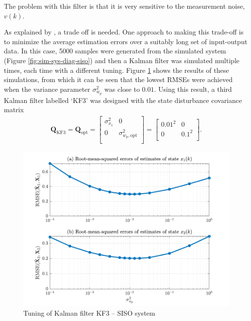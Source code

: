 The problem with this filter is that it is very sensitive to the measurement noise, $v(k)$. 

As explained by \cite{robertson_detection_1995}, a trade off is needed. One approach to making this trade-off is to minimize the average estimation errors over a suitably long set of input-output data. In this case, 5000 samples were generated from the simulated system (Figure \ref{fig:sim-sys-diag-siso}) and then a Kalman filter was simulated multiple times, each time with a different tuning. Figure \ref{fig:sim-sys-siso-KF3-tuning} shows the results of these simulations, from which it can be seen that the lowest RMSEs were achieved when the variance parameter $\sigma_{w_p}^2$ was close to $0.01$. Using this result, a third Kalman filter labelled `KF3' was designed with the state disturbance covariance matrix 
\begin{equation} \label{eq:sim-sys-siso-KF3-Q}
	\begin{aligned}
		\mathbf{Q}_{\text{KF3}}=\mathbf{Q}_{\text{opt}}=\begin{bmatrix}
			\sigma_{x_1}^2 & 0 \\
			0 & \sigma_{w_p,\text{opt}}^2 \\
		\end{bmatrix}=\begin{bmatrix}
			0.01^2 & 0 \\
			0 & 0.1^2 \\
		\end{bmatrix}.
	\end{aligned}
\end{equation}

\begin{figure}[htp]
	\centering
	\includegraphics[width=14cm]{images/rod_obs_sim1_3KF_Q_seed_6.pdf}
	\caption{Tuning of Kalman filter KF3 – SISO system}
	\label{fig:sim-sys-siso-KF3-tuning}
\end{figure}

